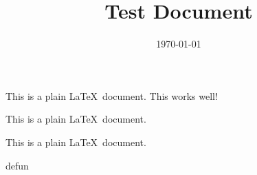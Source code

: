 \documentclass{article}
\title{Test Document}
\date{\today}
\begin{document}
This is a plain \LaTeX\ document.
This works well!
\begin{center}
    \begin{minipage}{.4\textwidth}
        This is a plain \LaTeX\ document.
    \end{minipage}
    \hspace{1pc}
    \begin{minipage}{0.4\textwidth}
        This is a plain \LaTeX\ document.
    \end{minipage}
\end{center}

defun
\end{document}
